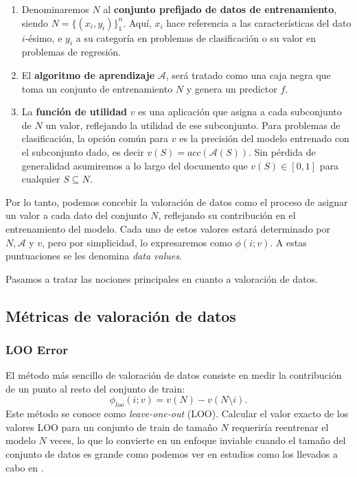 \begin{enumerate}
  \item  Denominaremos $N$ al \textbf{conjunto prefijado de datos
  de entrenamiento}, siendo $N = \{ (x_i, y_i) \}_1^n$.
  Aquí, $x_i$ hace referencia a las características del dato
  $i$-ésimo, e $y_i$ a su categoría en problemas de
  clasificación o su valor en problemas de regresión.
  
  \item El \textbf{algoritmo de aprendizaje}  $\mathcal{A}$,
  será tratado como una caja negra que toma un conjunto de
  entrenamiento $N$ y genera un predictor $f$.
  
  \item La \textbf{función de utilidad} $v$ es una aplicación
  que asigna a cada subconjunto de $N$ un valor, reflejando
  la utilidad de ese subconjunto. Para problemas de clasificación,
  la opción común para $v$ es la precisión del modelo
  entrenado con el subconjunto dado, es decir
  $v(S) = acc (\mathcal{A} (S))$. Sin pérdida de generalidad
  asumiremos a lo largo del documento que $v (S) \in [0, 1]$
  para cualquier $S \subseteq N$.
\end{enumerate}

Por lo tanto, podemos concebir la valoración de datos como el
proceso de asignar un valor a cada dato del conjunto $N$,
reflejando su contribución en el entrenamiento del modelo.
Cada uno de estos valores estará determinado por $N,
\mathcal{A}$ y $v$, pero por simplicidad, lo expresaremos
como $\phi(i ; v)$. A estas puntuaciones se les denomina
\textit{data values}.

Pasamos a tratar las nociones principales en cuanto a valoración
de datos.

\subsection{Métricas de valoración de datos}

\subsubsection{LOO Error}

El método más sencillo de valoración de datos consiste en medir la
contribución de un punto al resto del conjunto de train:
\[ \phi_{{loo}} (i ; v) = v (N) - v (N \setminus i) . \]
Este método se conoce como \textit{leave-one-out} (LOO). Calcular el
valor exacto de los valores LOO para un conjunto de train de tamaño $N$
requeriría reentrenar el modelo $N$ veces, lo que lo convierte en un
enfoque inviable cuando el tamaño del conjunto de datos es grande como
podemos ver en estudios como los llevados a cabo en {\cite{looFuck}}.

